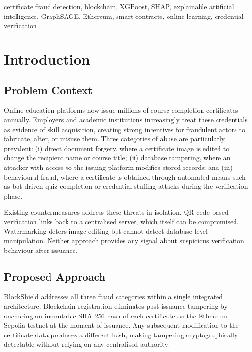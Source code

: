 \documentclass[conference]{IEEEtran}
\begin{document}
\begin{IEEEkeywords}
certificate fraud detection, blockchain, XGBoost, SHAP, explainable
artificial intelligence, GraphSAGE, Ethereum, smart contracts,
online learning, credential verification
\end{IEEEkeywords}

\section{Introduction}

\subsection{Problem Context}

Online education platforms now issue millions of course completion
certificates annually. Employers and academic institutions
increasingly treat these credentials as evidence of skill
acquisition, creating strong incentives for fraudulent actors to
fabricate, alter, or misuse them. Three categories of abuse are
particularly prevalent: (i) direct document forgery, where a
certificate image is edited to change the recipient name or course
title; (ii) database tampering, where an attacker with access to
the issuing platform modifies stored records; and (iii) behavioural
fraud, where a certificate is obtained through automated means such
as bot-driven quiz completion or credential stuffing attacks during
the verification phase.

Existing countermeasures address these threats in isolation.
QR-code-based verification links back to a centralised server,
which itself can be compromised. Watermarking deters image editing
but cannot detect database-level manipulation. Neither approach
provides any signal about suspicious verification behaviour after
issuance.

\subsection{Proposed Approach}

BlockShield addresses all three fraud categories within a single
integrated architecture. Blockchain registration eliminates
post-issuance tampering by anchoring an immutable SHA-256 hash of
each certificate on the Ethereum Sepolia testnet at the moment of
issuance. Any subsequent modification to the certificate data
produces a different hash, making tampering cryptographically
detectable without relying on any centralised authority.
\end{document}
